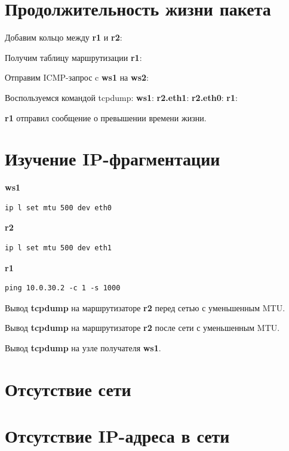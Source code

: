 \documentclass[a4paper,12pt]{article}
\begin{document}
\section{Продолжительность жизни пакета}
Добавим кольцо между \textbf{r1} и \textbf{r2}:

Получим таблицу маршрутизации \textbf{r1}:

Отправим ICMP-запрос c \textbf{ws1} на \textbf{ws2}:

Воспользуемся командой tcpdump:
\textbf{ws1}:
\textbf{r2.eth1}:
\textbf{r2.eth0}:
\textbf{r1}:

\textbf{r1} отправил сообщение о превышении времени жизни.

\section{Изучение IP-фрагментации}
\textbf{ws1}
\begin{verbatim}
ip l set mtu 500 dev eth0
\end{verbatim}

\textbf{r2}
\begin{verbatim}
ip l set mtu 500 dev eth1
\end{verbatim}

\textbf{r1}
\begin{verbatim}
ping 10.0.30.2 -c 1 -s 1000
\end{verbatim}

Вывод \textbf{tcpdump} на маршрутизаторе \textbf{r2} перед сетью с уменьшенным MTU.

Вывод \textbf{tcpdump} на маршрутизаторе \textbf{r2} после сети с уменьшенным MTU.

Вывод \textbf{tcpdump} на узле получателя \textbf{ws1}.


\section{Отсутствие сети}


\section{Отсутствие IP-адреса в сети}
\end{document}
